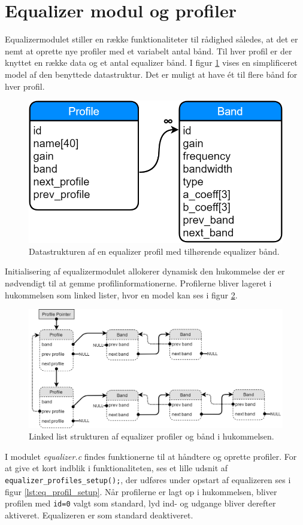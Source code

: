 \section{Equalizer modul og profiler}

Equalizermodulet stiller en række funktionaliteter til rådighed således, at det er nemt at oprette nye profiler med et variabelt antal bånd.
Til hver profil er der knyttet en række data og et antal equalizer bånd.
I figur \ref{fig:eq-profile-db} vises en simplificeret model af den benyttede datastruktur.
Det er muligt at have ét til flere bånd for hver profil.

\begin{figure}[h!]
	\centering
	\includegraphics[width=.4\textwidth]{billeder/eq_profile_db.png}
	\caption{Datastrukturen af en equalizer profil med tilhørende equalizer bånd.}
	\label{fig:eq-profile-db}
\end{figure}

Initialisering af equalizermodulet allokerer dynamisk den hukommelse der er nødvendigt til at gemme profilinformationerne.
Profilerne bliver lageret i hukommelsen som linked lister, hvor en model kan ses i figur \ref{fig:eq-profile-linked}.

\begin{figure}[h!]
	\centering
	\includegraphics[width=.9\textwidth]{billeder/eq_linked_profiles.png}
	\caption{Linked list strukturen af equalizer profiler og bånd i hukommelsen.}
	\label{fig:eq-profile-linked}
\end{figure}

I modulet \textit{equalizer.c} findes funktionerne til at håndtere og oprette profiler.
For at give et kort indblik i funktionaliteten, ses et lille udsnit af \texttt{equalizer\_profiles\_setup();}, der udføres under opstart af equalizeren ses i figur \ref{lst:eq_profil_setup}. 
Når profilerne er lagt op i hukommelsen, bliver profilen med \texttt{id=0} valgt som standard, lyd ind- og udgange bliver derefter aktiveret.
Equalizeren er som standard deaktiveret.

